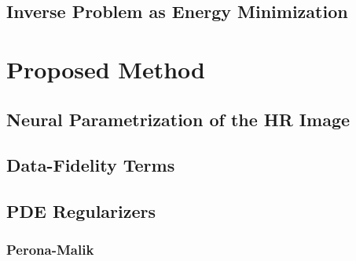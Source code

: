 \documentclass[conference]{IEEEtran}
\newcommand{\grad}{\nabla}
\newcommand{\divg}{\mathrm{div}}
\newcommand{\Real}{\mathbb{R}}
\newcommand{\loss}{\mathcal{L}}
\newcommand{\net}{u_{\theta}}
\DeclareMathOperator*{\argmin}{arg\,min}
\begin{document}
\subsection{Inverse Problem as Energy Minimization}


\section{Proposed Method}

\subsection{Neural Parametrization of the HR Image}

\subsection{Data-Fidelity Terms}

\subsection{PDE Regularizers}

\subsubsection{Perona-Malik}
\end{document}
